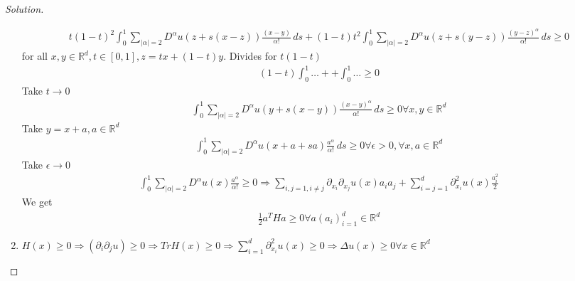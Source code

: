 \documentclass{report}
\theoremstyle{tommy}
\begin{document}
\begin{proof}[Solution]
\begin{enumerate}[label=\alph*)]
      \begin{align*}
        t(1-t)^2 \int_0^1 \sum_{|\alpha| = 2} D^\alpha u(z + s(x-z)) \frac{(x-y)}{\alpha!} \, ds + (1-t) t^2 \int_0^1 \sum_{|\alpha| = 2} D^\alpha u(z + s(y-z)) \frac{(y-z)^\alpha}{\alpha!} \,ds \ge 0
      \end{align*}
      for all \(x,y \in \mathbb{R}^d, t \in [0,1], z = tx+ (1-t)y\). Divides for \(t(1-t)\)
      \begin{align*}
        (1-t) \int_0^1 \dots + + \int_0^1 \dots \ge 0
      \end{align*}
      Take \(t \to 0\)
      \begin{align*}
        \int_0^1 \sum_{|\alpha| = 2} D^\alpha u(y + s(x-y)) \frac{(x-y)^\alpha}{\alpha!} \, ds \ge 0 \forall x,y \in \mathbb{R}^d
      \end{align*}
      Take \(y = x +a, a \in \mathbb{R}^d\)
      \begin{align*}
        \int_0^1 \sum_{|\alpha| = 2} D^\alpha u(x +a+sa) \frac{a^\alpha}{\alpha!} \, ds \ge 0 \forall \epsilon > 0, \forall x,a \in \mathbb{R}^d
      \end{align*}
      Take \(\epsilon \to 0\)
      \begin{align*}
        \int_0^1 \sum_{|\alpha| = 2} D^\alpha u(x) \frac{a^\alpha}{\alpha!} \ge 0 \Rightarrow \sum_{i,j = 1, i \ne j}\partial_{x_i} \partial_{x_j} u(x) a_i a_j + \sum_{i=j=1}^d \partial_{x_i}^2 u(x) \frac{a_i^2}{2}
      \end{align*}
      We get
      \begin{align*}
        \frac{1}{2} a^T Ha \ge 0 \forall a(a_i)_{i=1}^d \in \mathbb{R}^d
      \end{align*}
      \item \(H(x) \ge 0 \Rightarrow \left(\partial_i \partial_j u\right) \ge 0 \Rightarrow Tr H(x) \ge 0 \Rightarrow \sum_{i=1}^d \partial_{x_i}^2 u(x) \ge 0 \Rightarrow \Delta u(x) \ge 0 \forall x \in \mathbb{R}^d\)
    \end{enumerate}
  \end{proof}
\end{document}

